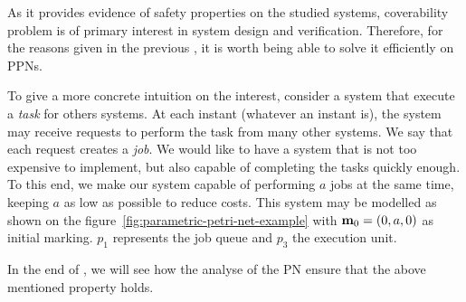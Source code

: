 
As it provides evidence of safety properties on the studied systems, coverability problem is of primary interest in system design and verification. Therefore, for the reasons given in the previous , it is worth being able to solve it efficiently on \acp{PPN}.

\label{label:mutex-example}
To give a more concrete intuition on the interest, consider a system that execute a \emph{task} for others systems.
At each instant (whatever an instant is), the system may receive requests to perform the task from many other systems. We say that each request creates a \emph{job}.
We would like to have a system that is not too expensive to implement, but also capable of completing the tasks quickly enough.
To this end, we make our system capable of performing $a$ jobs at the same time, keeping $a$ as low as possible to reduce costs.
This system may be modelled as shown on the figure~\ref{fig:parametric-petri-net-example} with $\mari = (0, \param[1], 0)$ as initial marking.
$p_1$ represents the job queue and $p_3$ the execution unit.

In the end of , we will see how the analyse of the \ac{PN} ensure that the above mentioned property holds.
